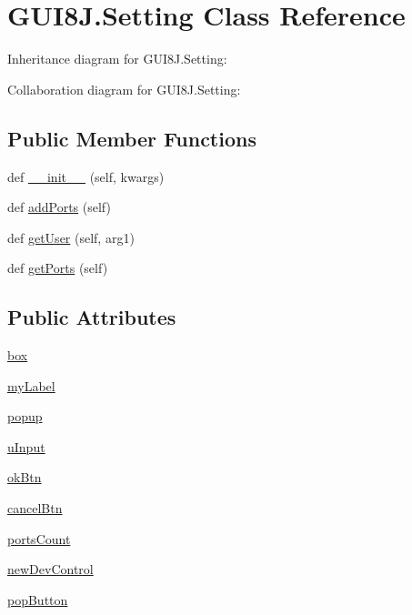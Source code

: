 \hypertarget{classGUI8J_1_1Setting}{}\section{G\+U\+I8\+J.\+Setting Class Reference}
\label{classGUI8J_1_1Setting}


Inheritance diagram for G\+U\+I8\+J.\+Setting\+:


Collaboration diagram for G\+U\+I8\+J.\+Setting\+:
\subsection*{Public Member Functions}
\begin{DoxyCompactItemize}
\item 
def \hyperlink{classGUI8J_1_1Setting_a118bbfa6da2c767281df5be11f562fff}{\+\_\+\+\_\+init\+\_\+\+\_\+} (self, kwargs)
\item 
def \hyperlink{classGUI8J_1_1Setting_a4f425d03b5c2b8273f01d7e09c3d70bd}{add\+Ports} (self)
\item 
def \hyperlink{classGUI8J_1_1Setting_aa6e419c4232c52e7bbd58276a8cef4d6}{get\+User} (self, arg1)
\item 
def \hyperlink{classGUI8J_1_1Setting_a028d38da60e64282789abd3a806b63d1}{get\+Ports} (self)
\end{DoxyCompactItemize}
\subsection*{Public Attributes}
\begin{DoxyCompactItemize}
\item 
\hyperlink{classGUI8J_1_1Setting_a4219ede3346060fd59ed6e6a4aca24fd}{box}
\item 
\hyperlink{classGUI8J_1_1Setting_ada3aafedcf582ee286ff00a94079c9ad}{my\+Label}
\item 
\hyperlink{classGUI8J_1_1Setting_af9e535ef6163a3ba1c20e030da0d2036}{popup}
\item 
\hyperlink{classGUI8J_1_1Setting_a3a6044d92a6632b16f1c0c6c752b00f2}{u\+Input}
\item 
\hyperlink{classGUI8J_1_1Setting_ab4cdb1301eefa6d2e79e7e65a18c0b3d}{ok\+Btn}
\item 
\hyperlink{classGUI8J_1_1Setting_a62871e42970ff78e1ad429a79417259e}{cancel\+Btn}
\item 
\hyperlink{classGUI8J_1_1Setting_a6c2f29d2abcaa775eee51448bac03fe3}{ports\+Count}
\item 
\hyperlink{classGUI8J_1_1Setting_a69ebf323efd2c19eeb9b6c631eb0df27}{new\+Dev\+Control}
\item 
\hyperlink{classGUI8J_1_1Setting_a8b2979deb33130070b861ae1689f8dac}{pop\+Button}
\end{DoxyCompactItemize}
